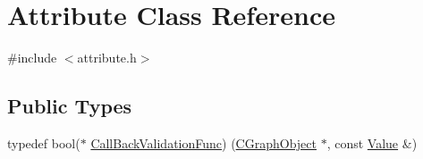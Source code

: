 \hypertarget{class_attribute}{}\section{Attribute Class Reference}
\label{class_attribute}


{\ttfamily \#include $<$attribute.\+h$>$}

\subsection*{Public Types}
\begin{DoxyCompactItemize}
\item 
typedef bool($\ast$ \hyperlink{class_attribute_a55241f36afbe917f6e57c0c8c01bd287}{Call\+Back\+Validation\+Func}) (\hyperlink{class_c_graph_object}{C\+Graph\+Object} $\ast$, const \hyperlink{class_value}{Value} \&)
\end{DoxyCompactItemize}
